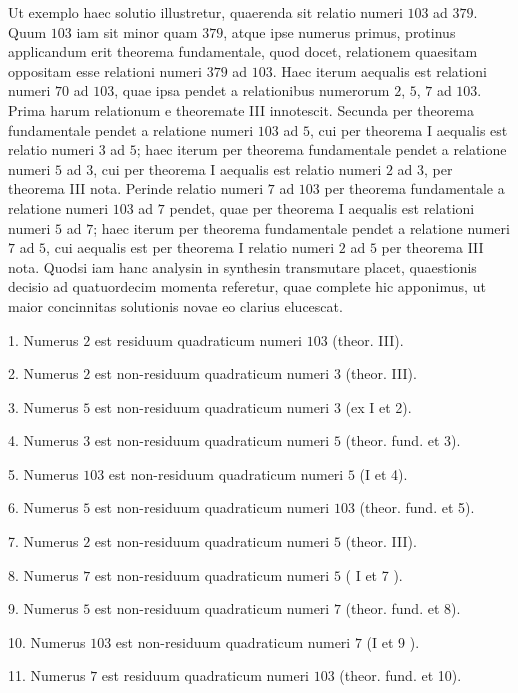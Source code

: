 \documentclass[twoside,12pt]{memoir}
\begin{document}
Ut exemplo haec solutio illustretur, quaerenda sit relatio numeri \(103\) ad \(379\). Quum \(103\) iam sit minor quam \(379\), atque ipse numerus primus, protinus applicandum erit theorema fundamentale, quod docet, relationem quaesitam oppositam esse relationi numeri \(379\) ad \(103\). Haec iterum aequalis est relationi numeri \(70\) ad \(103\), quae ipsa pendet a relationibus numerorum \(2\), \(5\), \(7\) ad \(103\). Prima harum relationum e theoremate III innotescit. Secunda per theorema fundamentale pendet a relatione numeri \(103\) ad \(5\), cui per theorema I aequalis est relatio numeri \(3\) ad \(5\); haec iterum per theorema fundamentale pendet a relatione numeri \(5\) ad \(3\), cui per theorema I aequalis est relatio numeri \(2\) ad \(3\), per theorema III nota. Perinde relatio numeri \(7\) ad \(103\) per theorema fundamentale a relatione numeri \(103\) ad \(7\) pendet, quae per theorema I aequalis est relationi numeri \(5\) ad \(7\); haec iterum per theorema fundamentale pendet a relatione numeri \(7\) ad \(5\), cui aequalis est per theorema I relatio numeri \(2\) ad \(5\) per theorema III nota. Quodsi iam hanc analysin in synthesin transmutare placet, quaestionis decisio ad quatuordecim momenta referetur, quae complete hic apponimus, ut maior concinnitas solutionis novae eo clarius elucescat.

1. Numerus \(2\) est residuum quadraticum numeri \(103\) (theor. III).
 
2. Numerus \(2\) est non-residuum quadraticum numeri \(3\) (theor. III).
 
3. Numerus \(5\) est non-residuum quadraticum numeri \(3\) (ex I et 2).
 
4. Numerus \(3\) est non-residuum quadraticum numeri \(5\) (theor. fund. et 3).
 
5. Numerus \(103\) est non-residuum quadraticum numeri \(5\) (I et 4).\pagebreak%
 
6. Numerus \(5\) est non-residuum quadraticum numeri \(103\) (theor. fund. et 5).
 
7. Numerus \(2\) est non-residuum quadraticum numeri \(5\) (theor. III).
 
8. Numerus \(7\) est non-residuum quadraticum numeri \(5\) ( I et 7 ).
 
9. Numerus \(5\) est non-residuum quadraticum numeri \(7\) (theor. fund. et 8).
 
10. Numerus \(103\) est non-residuum quadraticum numeri \(7\) (I et 9 ).
 
11. Numerus \(7\) est residuum quadraticum numeri \(103\) (theor. fund. et 10).
 
\end{document}
